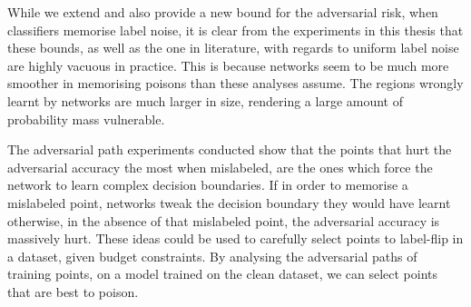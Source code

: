 \documentclass{ociamthesis}
\begin{document}
While we extend and also provide a new bound for the adversarial risk, when
classifiers memorise label noise, it is clear from the experiments in this
thesis that these bounds, as well as the one in literature, with regards to
uniform label noise are highly vacuous in practice. This is because networks
seem to be much more smoother in memorising poisons than these analyses assume.
The regions wrongly learnt by networks are much larger in size, rendering a
large amount of probability mass vulnerable.

The adversarial path experiments conducted show that the points that hurt the
adversarial accuracy the most when mislabeled, are the ones which force the
network to learn complex decision boundaries. If in order to memorise a
mislabeled point, networks tweak the decision boundary they would have learnt
otherwise, in the absence of that mislabeled point, the adversarial accuracy is
massively hurt. These ideas could be used to carefully select points to
label-flip in a dataset, given budget constraints. By analysing the adversarial
paths of training points, on a model trained on the clean dataset, we can select
points that are best to poison.


\clearpage


\end{document}
